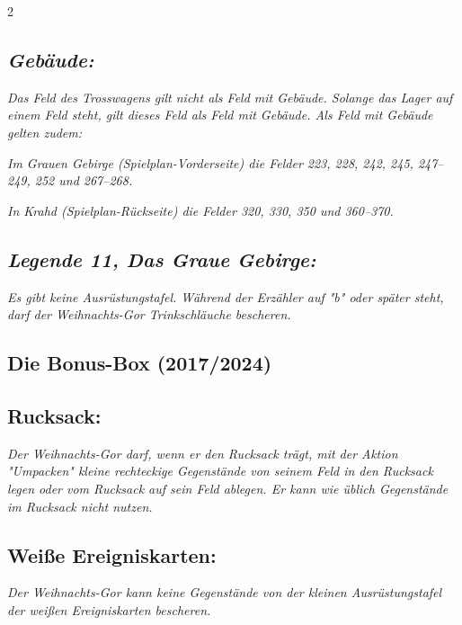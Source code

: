 \documentclass[10pt, a4paper, oneside]{book}
\newcommand{\fan}[1]{\textit{#1}}
\begin{document}
\begin{multicols*}{2}
\begin{bgcolor}
\subsection{\fan{Gebäude:}}

\fan{Das Feld des Trosswagens gilt nicht als Feld mit Gebäude. Solange das Lager auf einem Feld steht, gilt dieses Feld als Feld mit Gebäude. Als Feld mit Gebäude gelten zudem:}

\bullet{} \fan{Im Grauen Gebirge (Spielplan-Vorderseite) die Felder 223, 228, 242, 245, 247–249, 252 und 267–268.}

\bullet{} \fan{In Krahd (Spielplan-Rückseite) die Felder 320, 330, 350 und 360–370.}



\subsection{\fan{Legende 11, Das Graue Gebirge:}}

\fan{Es gibt keine Ausrüstungstafel. Während der Erzähler auf "b" oder später steht, darf der Weihnachts-Gor Trinkschläuche bescheren.}







\end{bgcolor}




\begin{bgcolor}[color-BB]
\section{Die Bonus-Box (2017/2024)}

\subsection{Rucksack:}

\fan{Der Weihnachts-Gor darf, wenn er den Rucksack trägt, mit der Aktion "Umpacken" kleine rechteckige Gegenstände von seinem Feld in den Rucksack legen oder vom Rucksack auf sein Feld ablegen. Er kann wie üblich Gegenstände im Rucksack nicht nutzen.}

\subsection{Weiße Ereigniskarten:}

\fan{Der Weihnachts-Gor kann keine Gegenstände von der kleinen Ausrüstungstafel der weißen Ereigniskarten bescheren.}



\end{bgcolor}
\end{multicols*}
\end{document}
